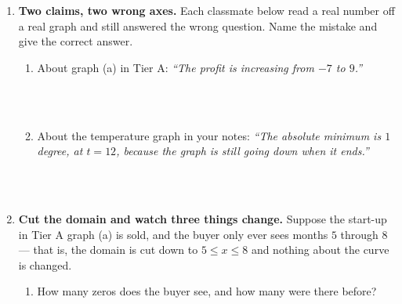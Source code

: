 \documentclass[10pt]{article}
\begin{document}
\boxguard[30]
\begin{tcolorbox}[colback=white, colframe=black!40, title=\textbf{Tier E --- Extension},
    fonttitle=\bfseries, arc=2mm, left=3mm, right=3mm, top=2mm, bottom=2mm, breakable]
\small

\begin{enumerate}[leftmargin=1.6em, itemsep=4pt, topsep=2pt]
  \item \textbf{Two claims, two wrong axes.} Each classmate below read a real number off a real
        graph and still answered the wrong question. Name the mistake and give the correct answer.
        \begin{enumerate}[label=(\alph*), leftmargin=1.6em, itemsep=3pt, topsep=3pt]
          \item About graph (a) in Tier A: \emph{``The profit is increasing from $-7$ to $9$.''}

\\
\\

          \item About the temperature graph in your notes: \emph{``The absolute minimum is $1$
                degree, at $t=12$, because the graph is still going down when it ends.''}

\\
\\
        \end{enumerate}

  \item \textbf{Cut the domain and watch three things change.} Suppose the start-up in Tier A graph
        (a) is sold, and the buyer only ever sees months $5$ through $8$ --- that is, the domain is
        cut down to $5 \le x \le 8$ and nothing about the curve is changed.
        \begin{enumerate}[label=(\alph*), leftmargin=1.6em, itemsep=3pt, topsep=3pt]
          \item How many zeros does the buyer see, and how many were there before?

\\


\end{enumerate}
\end{enumerate}
\end{tcolorbox}
\end{document}
